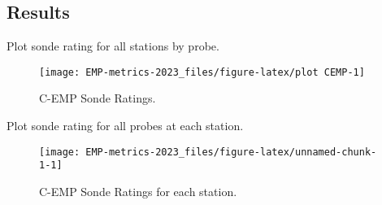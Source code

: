 \documentclass[
]{article}
\begin{document}
\hypertarget{results}{%
\subsection{Results}\label{results}}

Plot sonde rating for all stations by probe.

\begin{figure}

{\centering \texttt{[image: EMP-metrics-2023\_files/figure-latex/plot CEMP-1]} 

}

\caption{C-EMP Sonde Ratings.}\label{fig:plot CEMP}
\end{figure}

Plot sonde rating for all probes at each station.

\begin{figure}

{\centering \texttt{[image: EMP-metrics-2023\_files/figure-latex/unnamed-chunk-1-1]} 

}

\caption{C-EMP Sonde Ratings for each station.}\label{fig:unnamed-chunk-1}
\end{figure}
\end{document}
